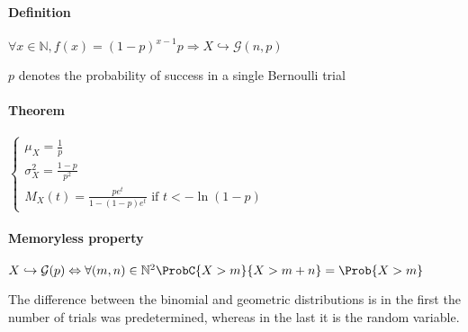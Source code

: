 \paragraph{Definition}
\begin{center}
$\forall x\in \mathbb{N}, f(x)= (1-p)^{x-1}p\Rightarrow X\hookrightarrow\mathcal{G}(n,p)$
\end{center}
$p$ denotes the probability of success in a single Bernoulli trial
\paragraph{Theorem}
\begin{center}
$\begin{cases}
	\mu_{X}=\frac{1}{p}\\
	\sigma_{X}^{2} = \frac{1-p}{p^{2}}\\
	M_{X}(t)=\frac{pe^{t}}{1-(1-p)e^{t}}\text{ if }t<-\ln(1-p)
\end{cases}$
\end{center}
\paragraph{Memoryless property}
\begin{center}
	$X\hookrightarrow\mathcal{G}(p)\Leftrightarrow \forall(m,n)\in\mathbb{N}^{2}\ProbC{X>m}{X>m+n}
	=\Prob{X>m}$
\end{center}
The difference between the binomial and geometric distributions is in the
first the number of trials was predetermined, whereas in the last it is
the random variable.
